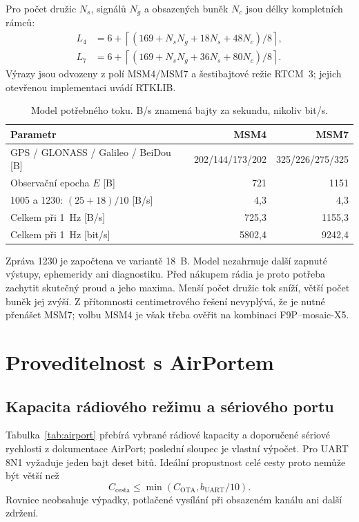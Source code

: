 \documentclass[11pt,a4paper]{article}
\begin{document}
Pro počet družic $N_s$, signálů $N_g$ a obsazených buněk $N_c$ jsou délky kompletních rámců:
\begin{align}
L_4 &=6+\left\lceil(169+N_sN_g+18N_s+48N_c)/8\right\rceil,\\
L_7 &=6+\left\lceil(169+N_sN_g+36N_s+80N_c)/8\right\rceil.
\end{align}
Výrazy jsou odvozeny z polí MSM4/MSM7 a šestibajtové režie RTCM~3; jejich otevřenou implementaci uvádí RTKLIB.\cite{rtcm}
\par
\begin{table}[htbp]\centering\small
\caption{Model potřebného toku. B/s znamená bajty za sekundu, nikoliv bit/s.}
\begin{tabularx}{\linewidth}{Yrr}
\toprule Parametr & MSM4 & MSM7\\ \midrule
GPS / GLONASS / Galileo / BeiDou [B] & 202/144/173/202 & 325/226/275/325\\
Observační epocha $E$ [B] & 721 & 1151\\
1005 a 1230: $(25+18)/10$ [B/s] & 4,3 & 4,3\\
Celkem při 1~Hz [B/s] & 725,3 & 1155,3\\
Celkem při 1~Hz [bit/s] & 5802,4 & 9242,4\\
\bottomrule\end{tabularx}
\end{table}
\par
Zpráva 1230 je započtena ve variantě 18~B. Model nezahrnuje další zapnuté výstupy, ephemeridy ani diagnostiku. Před nákupem rádia je proto potřeba zachytit skutečný proud a jeho maxima. Menší počet družic tok sníží, větší počet buněk jej zvýší. Z přítomnosti centimetrového řešení nevyplývá, že je nutné přenášet MSM7; volbu MSM4 je však třeba ověřit na kombinaci F9P--mosaic-X5.

\section{Proveditelnost s AirPortem}
\subsection{Kapacita rádiového režimu a sériového portu}
Tabulka~\ref{tab:airport} přebírá vybrané rádiové kapacity a doporučené sériové rychlosti z dokumentace AirPort; poslední sloupec je vlastní výpočet.\cite{airport} Pro UART 8N1 vyžaduje jeden bajt deset bitů. Ideální propustnost celé cesty proto nemůže být větší než
\begin{equation}
 C_{\mathrm{cesta}} \leq \min(C_{\mathrm{OTA}},b_{\mathrm{UART}}/10).
 \label{eq:capacity}
\end{equation}
Rovnice neobsahuje výpadky, potlačené vysílání při obsazeném kanálu ani další zdržení.
\end{document}
